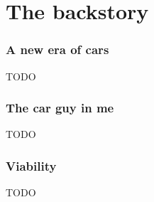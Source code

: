 \part{The backstory}
\label{part:backstory}


\section{A new era of cars}
\label{sec:carguy}

TODO


\section{The car guy in me}
\label{sec:carguy}

TODO


\section{Viability}
\label{sec:viability}

TODO

